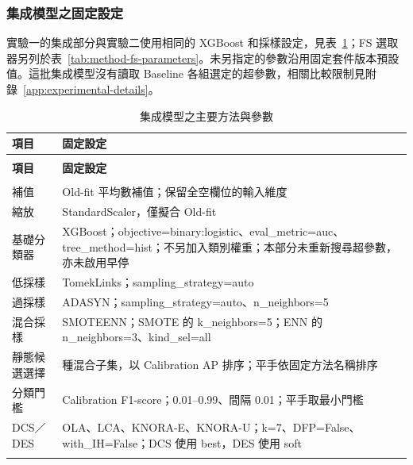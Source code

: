 \subsubsection{集成模型之固定設定}

實驗一的集成部分與實驗二使用相同的 XGBoost 和採樣設定，見表~\ref{tab:method-parameters}；FS 選取器另列於表~\ref{tab:method-fs-parameters}。未另指定的參數沿用固定套件版本預設值。這批集成模型沒有讀取 Baseline 各組選定的超參數，相關比較限制見附錄~\ref{app:experimental-details}。

\begingroup
\footnotesize
{}
\setlength{\tabcolsep}{4pt}
\renewcommand{\arraystretch}{1.25}
\setlength{\LTleft}{0pt plus 1fill}
\setlength{\LTright}{0pt plus 1fill}
\begin{longtable}{@{}>{\raggedright\arraybackslash}p{}>{\raggedright\arraybackslash}p{}@{}}
\caption{集成模型之主要方法與參數}\label{tab:method-parameters}\\
\toprule
\textbf{項目} & \textbf{固定設定} \\
\midrule
\endfirsthead
\multicolumn{2}{c}{表~\thetable（續）}\\
\toprule
\textbf{項目} & \textbf{固定設定} \\
\midrule
\endhead
\midrule
\multicolumn{2}{r}{續下頁}\\
\endfoot
\bottomrule
\endlastfoot
補值 & Old-fit 平均數補值；保留全空欄位的輸入維度 \\
\addlinespace[2pt]
縮放 & StandardScaler，僅擬合 Old-fit \\
\addlinespace[2pt]
基礎分類器 & XGBoost；{\normalfont objective=\allowbreak{}binary:logistic}、{\normalfont eval\_\allowbreak{}metric=\allowbreak{}auc}、{\normalfont tree\_\allowbreak{}method=\allowbreak{}hist}；不另加入類別權重；本部分未重新搜尋超參數，亦未啟用早停 \\
\addlinespace[2pt]
低採樣 & TomekLinks；{\normalfont sampling\_\allowbreak{}strategy=\allowbreak{}auto} \\
\addlinespace[2pt]
過採樣 & ADASYN；{\normalfont sampling\_\allowbreak{}strategy=\allowbreak{}auto}、{\normalfont n\_\allowbreak{}neighbors=\allowbreak{}5} \\
\addlinespace[2pt]
混合採樣 & SMOTEENN；SMOTE 的 {\normalfont k\_\allowbreak{}neighbors=\allowbreak{}5}；ENN 的 {\normalfont n\_\allowbreak{}neighbors=\allowbreak{}3}、{\normalfont kind\_\allowbreak{}sel=\allowbreak{}all} \\
\addlinespace[2pt]
靜態候選選擇 & 49 種混合子集，以 Calibration AP 排序；平手依固定方法名稱排序 \\
\addlinespace[2pt]
分類門檻 & Calibration F1-score；0.01–0.99、間隔 0.01；平手取最小門檻 \\
\addlinespace[2pt]
DCS／DES & OLA、LCA、KNORA-E、KNORA-U；{\normalfont k=\allowbreak{}7}、{\normalfont DFP=\allowbreak{}False}、{\normalfont with\_\allowbreak{}IH=\allowbreak{}False}；DCS 使用 {\normalfont best}，DES 使用 {\normalfont soft} \\*
\end{longtable}
\endgroup


